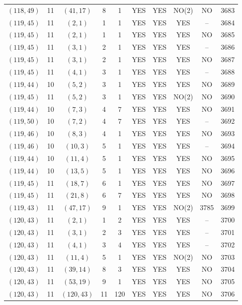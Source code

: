 \begin{longtable}{|c|c|c|c|c|c|c|c|c|c|}
$(118, 49)$ & 11 & $(41, 17)$ & 8 & 1 & YES & YES & NO(2) & NO & 3683\\
$(119, 45)$ & 11 & $(2, 1)$ & 1 & 1 & YES & YES & YES & -- & 3684\\
$(119, 45)$ & 11 & $(2, 1)$ & 1 & 1 & YES & YES & YES & NO & 3685\\
$(119, 45)$ & 11 & $(3, 1)$ & 2 & 1 & YES & YES & YES & -- & 3686\\
$(119, 45)$ & 11 & $(3, 1)$ & 2 & 1 & YES & YES & YES & NO & 3687\\
$(119, 45)$ & 11 & $(4, 1)$ & 3 & 1 & YES & YES & YES & -- & 3688\\
$(119, 44)$ & 10 & $(5, 2)$ & 3 & 1 & YES & YES & YES & NO & 3689\\
$(119, 45)$ & 11 & $(5, 2)$ & 3 & 1 & YES & YES & NO(2) & NO & 3690\\
$(119, 44)$ & 10 & $(7, 3)$ & 4 & 7 & YES & YES & YES & NO & 3691\\
$(119, 50)$ & 10 & $(7, 2)$ & 4 & 7 & YES & YES & YES & -- & 3692\\
$(119, 46)$ & 10 & $(8, 3)$ & 4 & 1 & YES & YES & YES & NO & 3693\\
$(119, 46)$ & 10 & $(10, 3)$ & 5 & 1 & YES & YES & YES & -- & 3694\\
$(119, 44)$ & 10 & $(11, 4)$ & 5 & 1 & YES & YES & YES & NO & 3695\\
$(119, 44)$ & 10 & $(13, 5)$ & 5 & 1 & YES & YES & YES & NO & 3696\\
$(119, 45)$ & 11 & $(18, 7)$ & 6 & 1 & YES & YES & YES & NO & 3697\\
$(119, 45)$ & 11 & $(21, 8)$ & 6 & 7 & YES & YES & YES & NO & 3698\\
$(119, 43)$ & 11 & $(47, 17)$ & 9 & 1 & YES & YES & NO(2) & 3785 & 3699\\
$(120, 43)$ & 11 & $(2, 1)$ & 1 & 2 & YES & YES & YES & -- & 3700\\
$(120, 43)$ & 11 & $(3, 1)$ & 2 & 3 & YES & YES & YES & -- & 3701\\
$(120, 43)$ & 11 & $(4, 1)$ & 3 & 4 & YES & YES & YES & -- & 3702\\
$(120, 43)$ & 11 & $(11, 4)$ & 5 & 1 & YES & YES & NO(2) & NO & 3703\\
$(120, 43)$ & 11 & $(39, 14)$ & 8 & 3 & YES & YES & YES & NO & 3704\\
$(120, 43)$ & 11 & $(53, 19)$ & 9 & 1 & YES & YES & YES & NO & 3705\\
$(120, 43)$ & 11 & $(120, 43)$ & 11 & 120 & YES & YES & YES & NO & 3706\\

\end{longtable}
